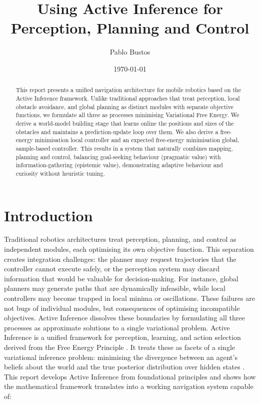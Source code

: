 \documentclass[a4paper, twoside]{article}
\date{\monthyeardate\today}
\author{Pablo Bustos}
\title{Using Active Inference for Perception, Planning and Control}
\begin{document}


\begin{abstract}
This report presents a unified navigation architecture for mobile robotics based on the Active Inference framework. Unlike traditional approaches that treat perception, local obstacle avoidance, and global planning as distinct modules with separate objective functions, we formulate all three as processes minimising Variational Free Energy. We derive a world-model building stage that learns online the positions and sizes of the obstacles and maintains a prediction-update loop over them. We also derive a free-energy minimisation local controller and an expected free-energy minimisation global, sample-based controller. This results in a system that naturally combines mapping, planning and control, balancing goal-seeking behaviour (pragmatic value) with information-gathering (epistemic value), demonstrating adaptive behaviour and curiosity without heuristic tuning.
\end{abstract}

\section{Introduction}
Traditional robotics architectures treat perception, planning, and control as independent modules, each optimising its own objective function. This separation creates integration challenges: the planner may request trajectories that the controller cannot execute safely, or the perception system may discard information that would be valuable for decision-making. 
For instance, global planners may generate paths that are dynamically infeasible, while local controllers may become trapped in local minima or oscillations. These failures are not bugs of individual modules, but consequences of optimising incompatible objectives.
Active Inference dissolves these boundaries by formulating all three processes as approximate solutions to a single variational problem.
Active Inference is a unified framework for perception, learning, and action selection derived from the Free Energy Principle \cite{friston2010}. It treats these as facets of a single variational inference problem: minimising the divergence between an agent's beliefs about the world and the true posterior distribution over hidden states \cite{lanillos2021active}\cite{dacosta2022active}.
This report develops Active Inference from foundational principles and shows how the mathematical framework translates into a working navigation system capable of:
\end{document}
